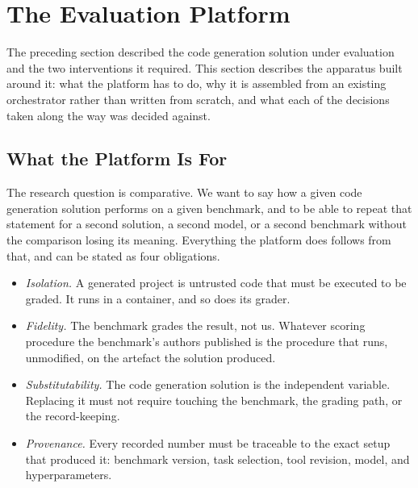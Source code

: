 %
%

\section{The Evaluation Platform}
\label{sec:evaluation-platform}

The preceding section described the code generation solution under evaluation
and the two interventions it required. This section describes the apparatus
built around it: what the platform has to do, why it is assembled from an
existing orchestrator rather than written from scratch, and what each of the
decisions taken along the way was decided against.

\subsection{What the Platform Is For}
\label{sec:platform-purpose}

The research question is comparative. We want to say how a given code
generation solution performs on a given benchmark, and to be able to repeat
that statement for a second solution, a second model, or a second benchmark
without the comparison losing its meaning. Everything the platform does follows
from that, and can be stated as four obligations.

\begin{itemize}
\item \emph{Isolation.} A generated project is untrusted code that must be
      executed to be graded. It runs in a container, and so does its grader.
\item \emph{Fidelity.} The benchmark grades the result, not us. Whatever
      scoring procedure the benchmark's authors published is the procedure that
      runs, unmodified, on the artefact the solution produced.
\item \emph{Substitutability.} The code generation solution is the independent
      variable. Replacing it must not require touching the benchmark, the
      grading path, or the record-keeping.
\item \emph{Provenance.} Every recorded number must be traceable to the exact
      setup that produced it: benchmark version, task selection, tool revision,
      model, and hyperparameters.
\end{itemize}

